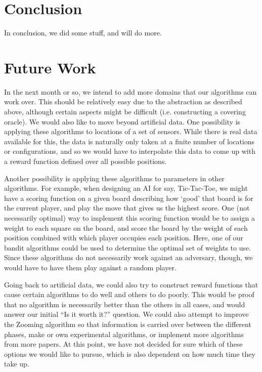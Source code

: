 \documentclass{article}
\begin{document}
\section{Conclusion}
In conclusion, we did some stuff, and will do more.
\\
\section{Future Work}
In the next month or so, we intend to add more domains that our algorithms
can work over.  This should be relatively easy due to the abstraction
as described above, although certain aspects might be difficult (i.e.
constructing a covering oracle).  We would also like to move beyond
artificial data.  One possibility is applying these algorithms to
locations of a set of sensors.  While there is real data available for 
this, the data is naturally only taken at a finite number of locations
or configurations, and so we would have to interpolate this data to come
up with a reward function defined over all possible positions.

Another possibility is applying these algorithms to parameters in other
algorithms.  For example, when designing an AI for say, Tic-Tac-Toe, 
we might have a scoring function on a given board describing how
`good' that board is for the current player, and play the move that gives
us the highest score.  One (not necessarily optimal)
way to implement this scoring function would be to assign a weight to each
square on the board, and score the board by the weight of each position
combined with which player occupies each position.  Here, one of our
bandit algorithms could be used to determine the optimal set of weights
to use.  Since these algorithms do not necessarily work against an
adversary, though, we would have to have them play against a random
player.

Going back to artificial data, we could also try to construct reward
functions that cause certain algorithms to do well and others to do poorly.
This would be proof that no algorithm is necessarily better than the others
in all cases, and would answer our initial ``Is it worth it?'' question.
We could also attempt to improve the Zooming algorithm so that information
is carried over between the different phases, make or own experimental
algorithms, or implement more algorithms from more papers.  At this
point, we have not decided for sure which of these options we would like
to pursue, which is also dependent on how much time they take up.
\end{document}
